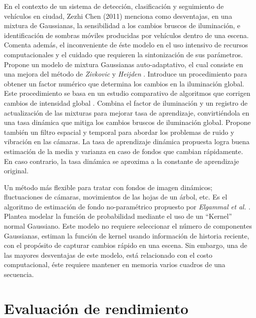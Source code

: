 \indent En el contexto de un sistema de detección, clasificación y seguimiento de vehículos \cite{chen_vehicle_2012} en ciudad,  Zezhi Chen \cite{chen_self-adaptive_2011} (2011) menciona como desventajas, en una mixtura de Gaussianas, la sensibilidad a los cambios bruscos de iluminación, e identificación de sombras móviles producidas por vehículos dentro de una escena. Comenta además, el inconveniente de éste modelo en el uso intensivo de recursos computacionales y el cuidado que requieren la sintonización de sus parámetros. Propone un modelo de mixtura Gaussianas auto-adaptativo, el cual consiste en una mejora del método de \textit{Zivkovic} y \textit{Heijden} \cite{zivkovic_efficient_2006}. Introduce un procedimiento para obtener un factor numérico que determina los cambios en la iluminación global. Este procedimiento se basa en un estudio comparativo de algoritmos que corrigen cambios de intensidad global \cite{withagen_intensity_2010}. Combina el factor de iluminación y un registro de actualización de las mixturas para mejorar tasa de aprendizaje, convirtiéndola en una tasa dinámica que mitiga los cambios bruscos de iluminación global. Propone también un filtro espacial y temporal \cite{chen_background_2009} para abordar los problemas de ruido y vibración en las cámaras. La tasa de aprendizaje dinámica propuesta logra buena estimación de la media y varianza en caso de fondos que cambian rápidamente. En caso contrario, la tasa dinámica se aproxima a la constante de aprendizaje original\cite{zivkovic_efficient_2006}.


\indent Un método más flexible para tratar con fondos de imagen dinámicos; fluctuaciones de cámaras, movimientos de las hojas de un árbol, etc. Es el algoritmo de estimación de fondo no-paramétrico propuesto por \textit{Elgammal et al.} \cite{elgammal_nonparametricmodel_2000}. Plantea modelar la función de probabilidad mediante el uso de un ``Kernel'' normal Gaussiano. Este modelo no requiere seleccionar el número de componentes Gaussianas, estiman la función de kernel usando información de historia reciente, con el propósito de capturar cambios rápido en una escena. Sin embargo, una de las mayores desventajas de este modelo, está relacionado con el costo computacional, éste requiere mantener en memoria varios cuadros de una secuencia.


\section{Evaluación de rendimiento}

